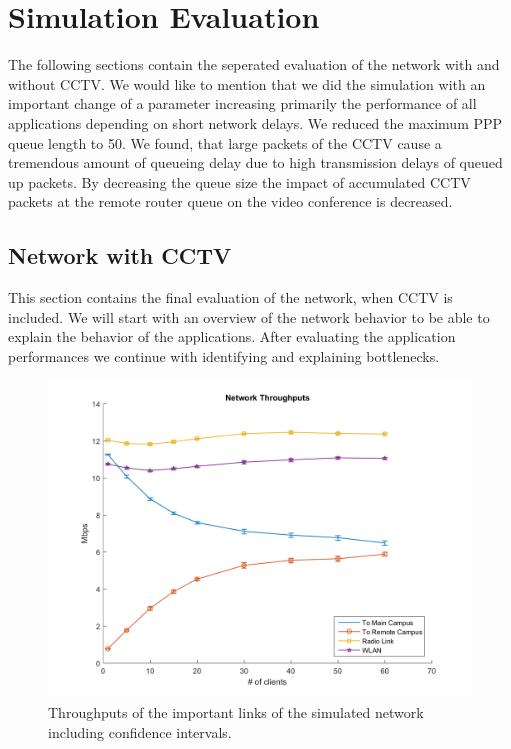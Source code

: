\documentclass[
10pt, %
a4paper, %
oneside, %
headinclude,footinclude, %
BCOR5mm, %
]{scrartcl}
\begin{document}
\section{Simulation Evaluation}
The following sections contain the seperated evaluation of the network with and without CCTV.
We would like to mention that we did the simulation with an important change of a parameter increasing primarily the performance of all applications depending on short network delays. We reduced the maximum PPP queue length to 50. We found, that large packets of the CCTV cause a tremendous amount of queueing delay due to high transmission delays of queued up packets. By decreasing the queue size the impact of accumulated CCTV packets at the remote router queue on the video conference is decreased.

\subsection{Network with CCTV}
This section contains the final evaluation of the network, when CCTV is included. We will start with an overview of the network behavior to be able to explain the behavior of the applications. After evaluating the application performances we continue with identifying and explaining bottlenecks.
\begin{figure}[!ht]
  \centering
  \includegraphics[width=\textwidth]{Figures/cctv/Network_Throughputs.png}
  \caption{Throughputs of the important links of the simulated network including confidence intervals.} \label{fig:cctv_network_throughputs}
\end{figure}
\end{document}
